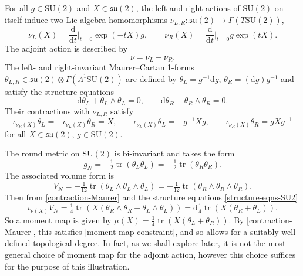 \documentclass[pdftex]{sigma}
\newcommand{\su}{{\mathfrak{su}}}
\newcommand{\SU}{{\mathrm{SU}}}
\newcommand{\1}{{\mathbb{1}}}
\def \d{\mathrm{d}}
\newcommand{\tr}{{\operatorname{tr}}}
\numberwithin{equation}{section}
\begin{document}
For all $g\in\SU(2)$ and $X\in\su(2)$, the left and right actions of $\SU(2)$ on itself induce two Lie algebra homomorphisms $\nu_{L,R}\colon \su(2)\to\Gamma(T\SU(2))$,
\begin{equation*}
\nu_L(X)=\frac{\d}{\d t}\Big|_{t=0}\exp(-tX)g,\qquad\nu_R(X)=\frac{\d}{\d t}\Big|_{t=0}g\exp(tX).
\end{equation*}
The adjoint action is described by
\begin{equation*}
\nu=\nu_L+\nu_R.
\end{equation*}
The left- and right-invariant Maurer--Cartan 1-forms $\theta_{L,R}\in\su(2)\otimes\Gamma(\Lambda^1\SU(2))$ are defined by $\theta_L=g^{-1}\d g$, $\theta_R=(\d g)g^{-1}$ and satisfy the structure equations
\begin{equation}\label{structure-eqns-SU2}
\d\theta_L+\theta_L\wedge\theta_L=0,\qquad\d\theta_R-\theta_R\wedge\theta_R=0.
\end{equation}
Their contractions with $\nu_{L,R}$ satisfy{\samepage
\begin{equation}\label{contraction-Maurer}
\iota_{\nu_R(X)}\theta_L=-\iota_{\nu_L(X)}\theta_R=X,\qquad \iota_{\nu_L(X)}\theta_L = -g^{-1}Xg,\qquad \iota_{\nu_R(X)}\theta_R = gXg^{-1}
\end{equation}
for all $X\in\su(2)$, $g\in\SU(2)$.}

The round metric on $\SU(2)$ is bi-invariant and takes the form
\begin{equation*}
g_N=-\tfrac{1}{2}\tr(\theta_L\theta_L)=-\tfrac{1}{2}\tr(\theta_R\theta_R).
\end{equation*}
The associated volume form is
\begin{equation*}
V_N=-\tfrac{1}{12}\tr(\theta_L\wedge\theta_L\wedge\theta_L)=-\tfrac{1}{12}\tr(\theta_R\wedge\theta_R\wedge\theta_R).
\end{equation*}
Then from \eqref{contraction-Maurer} and the structure equations \eqref{structure-eqns-SU2}
\begin{equation*}
\iota_{\nu(X)}V_N = \tfrac{1}{4}\tr(X(\theta_R\wedge\theta_R-\theta_L\wedge\theta_L))
=\d\tfrac{1}{4}\tr(X(\theta_R+\theta_L)).
\end{equation*}
So a moment map is given by $\mu(X)=\tfrac{1}{4}\tr(X(\theta_L+\theta_R))$. By \eqref{contraction-Maurer}, this satisfies \eqref{moment-map-constraint}, and so allows for a suitably well-defined topological degree. In fact, as we shall explore later, it is not the most general choice of moment map for the adjoint action, however this choice suffices for the purpose of this illustration.
\end{document}
